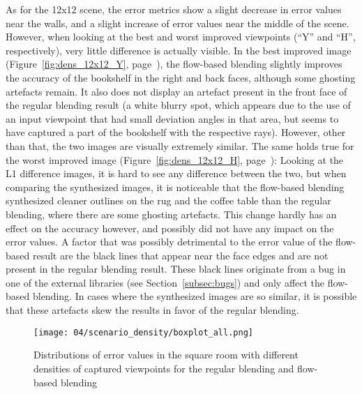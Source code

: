 As for the 12x12 scene, the error metrics show a slight decrease in error values near the walls, and a slight increase of error values near the middle of the scene. However, when looking at the best and worst improved viewpoints (``Y'' and ``H'', respectively), very little difference is actually visible.
In the best improved image (Figure~\ref{fig:dens_12x12_Y}, page~\pageref{fig:dens_12x12_Y}), the flow-based blending slightly improves the accuracy of the bookshelf in the right and back faces, although some ghosting artefacts remain. It also does not display an artefact present in the front face of the regular blending result (a white blurry spot, which appears due to the use of an input viewpoint that had small deviation angles in that area, but seems to have captured a part of the bookshelf with the respective rays). However, other than that, the two images are visually extremely similar.
The same holds true for the worst improved image (Figure~\ref{fig:dens_12x12_H}, page~\pageref{fig:dens_12x12_H}): Looking at the L1 difference images, it is hard to see any difference between the two, but when comparing the synthesized images, it is noticeable that the flow-based blending synthesized cleaner outlines on the rug and the coffee table than the regular blending, where there are some ghosting artefacts. This change hardly has an effect on the accuracy however, and possibly did not have any impact on the error values.
A factor that was possibly detrimental to the error value of the flow-based result are the black lines that appear near the face edges and are not present in the regular blending result. These black lines originate from a bug in one of the external libraries (see Section~\ref{subsec:bugs}) and only affect the flow-based blending. In cases where the synthesized images are so similar, it is possible that these artefacts skew the results in favor of the regular blending.

\begin{figure}
		\centering
		\texttt{[image: 04/scenario\_density/boxplot\_all.png]}
		\caption[Distributions of all of the results with different densities]{Distributions of error values in the square room with different densities of captured viewpoints for the regular blending and flow-based blending}
		\label{fig:scenario_dens_boxplot}
\end{figure}

